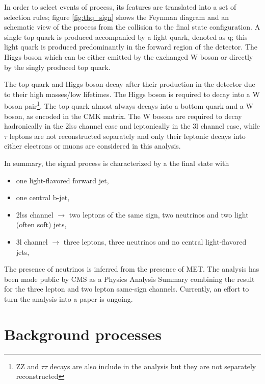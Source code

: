 In order to select events of \tHq process, its features are translated into a set of selection rules; figure \ref{fig:thq_sign} shows the Feynman diagram and an schematic view of the \tHq process from the \pp collision to the final state configuration. A single top quark is produced accompanied by a light quark, denoted as q; this light quark is produced predominantly in the forward region of the detector. The Higgs boson which can be either emitted by the exchanged W boson or directly by the singly produced top quark.

The top quark and Higgs boson decay after their production in the detector due to their high masses/low lifetimes. The Higgs boson is required to decay into a W boson pair\footnote{ZZ and $\tau\tau$ decays are also include in the analysis but they are not separately reconstructed}. The top quark almost always decays into a bottom quark and a W boson, as encoded in the CMK matrix. The W bosons are required to decay hadronically  in the 2lss channel case and leptonically in the 3l channel case, while $\tau$ leptons are not reconstructed separately and only their leptonic decays into either electrons or muons are considered in this analysis.

In summary, the signal process is characterized by a the final state with

\begin{itemize}
\item one light-flavored forward jet,
\item one central b-jet,
\item 2lss channel $\to$ two leptons of the same sign, two neutrinos and two light (often soft) jets,
\item 3l channel $\to$ three leptons, three neutrinos and no central light-flavored jets,
\end{itemize}

The presence of neutrinos is inferred from the presence of MET. The analysis has been made public by CMS as a Physics Analysis Summary\cite{CMS_PAS_HIG_17-005} combining the result for the three lepton and two lepton same-sign channels. Currently, an effort to turn the analysis into a paper is ongoing.


\section{Background processes}\label{sec:bg}

